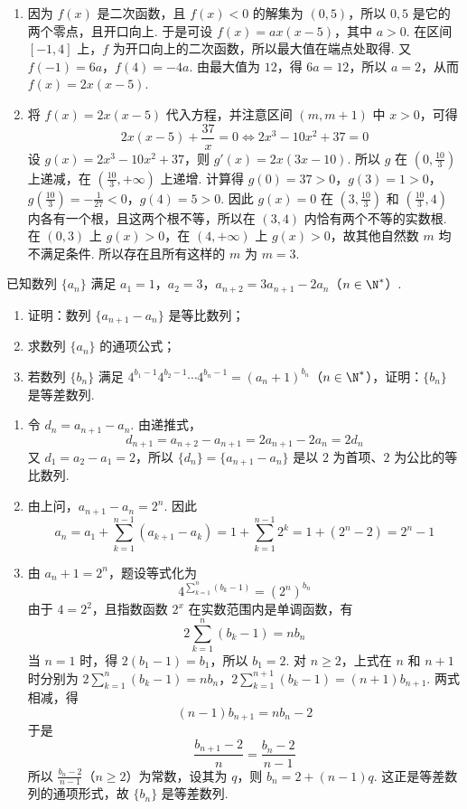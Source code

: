 \begin{solution}
\begin{enumerate}
\item 因为 \(f(x)\) 是二次函数，且 \(f(x)<0\) 的解集为 \((0,5)\)，所以 \(0,5\) 是它的两个零点，且开口向上. 于是可设
\(f(x)=a x(x-5)\)，其中 \(a>0\). 在区间 \([-1,4]\) 上，\(f\) 为开口向上的二次函数，所以最大值在端点处取得. 又
\(f(-1)=6a\)，\(f(4)=-4a\).
由最大值为 \(12\)，得 \(6a=12\)，所以 \(a=2\)，从而
\(f(x)=2x(x-5)\).
\item 将 \(f(x)=2x(x-5)\) 代入方程，并注意区间 \((m,m+1)\) 中 \(x>0\)，可得
\[
2x(x-5)+\frac{37}{x}=0
\Longleftrightarrow
2x^3-10x^2+37=0
\]
设 \(g(x)=2x^3-10x^2+37\)，则
\(g'(x)=2x(3x-10)\). 所以 \(g\) 在 \((0,\frac{10}{3})\) 上递减，在 \((\frac{10}{3},+\infty)\) 上递增. 计算得
\(g(0)=37>0\)，\(g(3)=1>0\)，\(g\left(\frac{10}{3}\right)=-\frac{1}{27}<0\)，\(g(4)=5>0\).
因此 \(g(x)=0\) 在 \((3,\frac{10}{3})\) 和 \((\frac{10}{3},4)\) 内各有一个根，且这两个根不等，所以在 \((3,4)\) 内恰有两个不等的实数根. 在 \((0,3)\) 上 \(g(x)>0\)，在 \((4,+\infty)\) 上 \(g(x)>0\)，故其他自然数 \(m\) 均不满足条件. 所以存在且所有这样的 \(m\) 为 \(m=3\).
\end{enumerate}
\end{solution}

\begin{problem}
已知数列 \(\{a_n\}\) 满足 \(a_1 = 1\)，\(a_2 = 3\)，\(a_{n+2} = 3a_{n+1} - 2a_n\)（\(n \in \N^*\)）.

\begin{enumerate}
\item 证明：数列 \(\{a_{n+1} - a_n\}\) 是等比数列；
\item 求数列 \(\{a_n\}\) 的通项公式；
\item 若数列 \(\{b_n\}\) 满足 \(4^{b_1-1}4^{b_2-1}\cdots 4^{b_n-1} = (a_n + 1)^{b_n}\)（\(n \in \N^*\)），证明：\(\{b_n\}\) 是等差数列.
\end{enumerate}
\end{problem}

\begin{solution}
\begin{enumerate}
\item 令 \(d_n=a_{n+1}-a_n\). 由递推式，
\[
d_{n+1}=a_{n+2}-a_{n+1}=2a_{n+1}-2a_n=2d_n
\]
又 \(d_1=a_2-a_1=2\)，所以 \(\{d_n\}=\{a_{n+1}-a_n\}\) 是以 \(2\) 为首项、\(2\) 为公比的等比数列.
\item 由上问，\(a_{n+1}-a_n=2^n\). 因此
\[
a_n=a_1+\sum_{k=1}^{n-1}(a_{k+1}-a_k)
=1+\sum_{k=1}^{n-1}2^k
=1+(2^n-2)=2^n-1
\]
\item 由 \(a_n+1=2^n\)，题设等式化为
\[
4^{\sum_{k=1}^n(b_k-1)}=(2^n)^{b_n}
\]
由于 \(4=2^2\)，且指数函数 \(2^x\) 在实数范围内是单调函数，有
\[
2\sum_{k=1}^n(b_k-1)=nb_n
\]
当 \(n=1\) 时，得 \(2(b_1-1)=b_1\)，所以 \(b_1=2\). 对 \(n\geq2\)，上式在 \(n\) 和 \(n+1\) 时分别为
\(2\sum_{k=1}^n(b_k-1)=nb_n\)，\(2\sum_{k=1}^{n+1}(b_k-1)=(n+1)b_{n+1}\).
两式相减，得
\[
(n-1)b_{n+1}=nb_n-2
\]
于是
\[
\frac{b_{n+1}-2}{n}=\frac{b_n-2}{n-1}
\]
所以 \(\frac{b_n-2}{n-1}\)（\(n\geq2\)）为常数，设其为 \(q\)，则
\(b_n=2+(n-1)q\). 这正是等差数列的通项形式，故 \(\{b_n\}\) 是等差数列.
\end{enumerate}
\end{solution}
